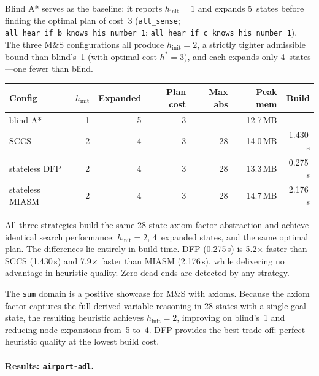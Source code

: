 \documentclass[11pt,a4paper]{article}
\begin{document}
Blind A* serves as the baseline: it reports $h_{\mathrm{init}} = 1$ and
expands 5~states before finding the optimal plan of cost~3
(\texttt{all\_sense}; \texttt{all\_hear\_if\_b\_knows\_his\_number\_1};
\texttt{all\_hear\_if\_c\_knows\_his\_number\_1}).
The three M\&S configurations all produce $h_{\mathrm{init}} = 2$, a strictly
tighter admissible bound than blind's~1 (with optimal cost $h^* = 3$), and each
expands only 4~states---one fewer than blind.

\begin{center}
\small
\begin{tabular}{lrrrrrr}
\toprule
\textbf{Config} & \textbf{$h_{\mathrm{init}}$} & \textbf{Expanded}
  & \textbf{Plan cost} & \textbf{Max abs} & \textbf{Peak mem} & \textbf{Build} \\
\midrule
blind A*            & 1 & 5 & 3 & ---  & 12.7\,MB & ---       \\
SCCS                & 2 & 4 & 3 & 28   & 14.0\,MB & 1.430\,s  \\
stateless DFP       & 2 & 4 & 3 & 28   & 13.3\,MB & 0.275\,s  \\
stateless MIASM     & 2 & 4 & 3 & 28   & 14.7\,MB & 2.176\,s  \\
\bottomrule
\end{tabular}
\end{center}

All three strategies build the same 28-state axiom factor abstraction and
achieve identical search performance: $h_{\mathrm{init}} = 2$, 4~expanded
states, and the same optimal plan.  The differences lie entirely in build time.
DFP (0.275\,s) is 5.2$\times$ faster than SCCS (1.430\,s) and 7.9$\times$
faster than MIASM (2.176\,s), while delivering no advantage in heuristic
quality.  Zero dead ends are detected by any strategy.

The \texttt{sum} domain is a positive showcase for M\&S with axioms.  Because
the axiom factor captures the full derived-variable reasoning in 28 states with
a single goal state, the resulting heuristic achieves $h_{\mathrm{init}} = 2$,
improving on blind's~1 and reducing node expansions from~5 to~4.  DFP provides
the best trade-off: perfect heuristic quality at the lowest build cost.

\paragraph{Results: \texttt{airport-adl}.}
\end{document}
